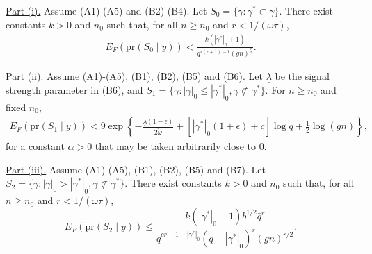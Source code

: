 \begin{theorem}

\underline{Part (i).}
Assume (A1)-(A5) and (B2)-(B4). Let $S_0= \{\gamma: \gamma^* \subset \gamma\}$.
There exist constants $k>0$ and $n_0$ such that, for all $n \geq n_0$ and $r<1/(\omega \tau)$,
\begin{align}
E_F(\mbox{pr}(S_0 \mid y)) < \frac{k (|\gamma^*|_0 +1)}{q^{r(c + 1) -1} (g n)^{\frac{r}{2}}}.
\nonumber
\end{align}

\underline{Part (ii).}
Assume (A1)-(A5), (B1), (B2), (B5) and (B6). Let $\underline{\lambda}$ be the signal strength parameter in (B6),
and $S_1= \{\gamma: |\gamma|_0 \leq |\gamma^*|_0, \gamma \not\subset \gamma^*\}$.
For $n \geq n_0$ and fixed $n_0$,
\begin{align}
E_F(\mbox{pr}(S_1 \mid y))
< 9 \exp \left\{  -\frac{\underline{\lambda}(1-\epsilon)}{2 \tilde{\omega}} + [|\gamma^*|_0(1+\epsilon) + c] \log q + \frac{1}{2} \log(gn) \right\},
\nonumber
\end{align}
for a constant $\alpha >0$ that may be taken arbitrarily close to 0.

\underline{Part (iii).}
Assume (A1)-(A5), (B1), (B2), (B5) and (B7). 
Let $S_2= \{\gamma: |\gamma|_0 > |\gamma^*|_0, \gamma \not\subset \gamma^*\}$.
There exist constants $k>0$ and $n_0$ such that, for all $n \geq n_0$ and $r<1/(\omega \tau)$,
$$
E_F(\mbox{pr}(S_2 \mid y)) \leq \frac{k (|\gamma^*|_0+1) b^{1/2} \bar{q}^r}{q^{cr-1-|\gamma^*|_0} (q - |\gamma^*|_0)^r (g n)^{r/2}}.
$$
\label{thm:pp}
\end{theorem}

